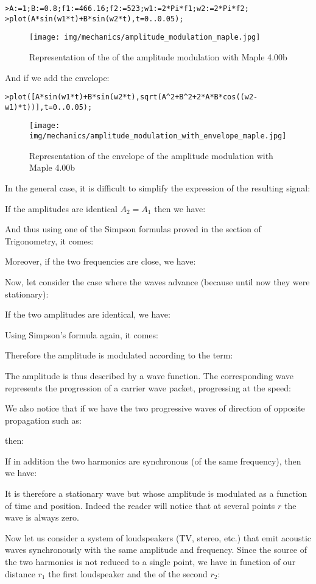 	\texttt{>A:=1;B:=0.8;f1:=466.16;f2:=523;w1:=2*Pi*f1;w2:=2*Pi*f2;\\
		>plot(A*sin(w1*t)+B*sin(w2*t),t=0..0.05);}
	\begin{figure}[H]
		\centering
		\texttt{[image: img/mechanics/amplitude\_modulation\_maple.jpg]}
		\caption[]{Representation of the of the amplitude modulation with Maple 4.00b}
	\end{figure}
	And if we add the envelope:
	
	\texttt{>plot([A*sin(w1*t)+B*sin(w2*t),sqrt(A\string^2+B\string^2+2*A*B*cos((w2-w1)*t))],t=0..0.05);}
	\begin{figure}[H]
		\centering
		\texttt{[image: img/mechanics/amplitude\_modulation\_with\_envelope\_maple.jpg]}
		\caption{Representation of the envelope of the amplitude modulation with Maple 4.00b}
	\end{figure}
	In the general case, it is difficult to simplify the expression of the resulting signal:
	
	If the amplitudes are identical $A_2=A_1$ then we have:
	
	And thus using one of the Simpson formulas proved in the section of Trigonometry, it comes:
	
	Moreover, if the two frequencies are close, we have:
	
	Now, let consider the case where the waves advance (because until now they were stationary):
	
	If the two amplitudes are identical, we have:
	
	Using Simpson's formula again, it comes:
	
	Therefore the amplitude is modulated according to the term:
	
	The amplitude is thus described by a wave function. The corresponding wave represents the progression of a carrier wave packet, progressing at the speed:
	
	We also notice that if we have the two progressive waves of direction of opposite propagation such as:
	
	then:
	
	If in addition the two harmonics are synchronous (of the same frequency), then we have:
	
	It is therefore a stationary wave but whose amplitude is modulated as a function of time and position. Indeed the reader will notice that at several points $r$ the wave is always zero.
	
	Now let us consider a system of loudspeakers (TV, stereo, etc.) that emit acoustic waves synchronously with the same amplitude and frequency. Since the source of the two harmonics is not reduced to a single point, we have in function of our distance $r_1$ the first loudspeaker and the of the second $r_2$:
	
